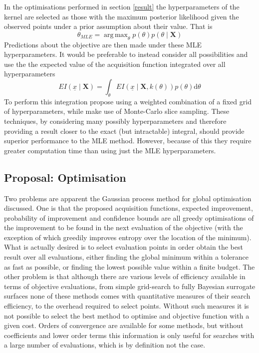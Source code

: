 \documentclass[a4paper, 10 pt, conference]{ieeeconf}  %
\DeclareMathOperator*{\argmax}{arg\,max}
\begin{document}
In the optimisations performed in section \ref{result} the hyperparameters of the kernel are selected as those with the maximum posterior likelihood given the observed points under a prior assumption about their value. That is
\begin{equation}
\theta_{MLE} = \argmax_{\theta} p(\theta)p(\theta \mid \mathbf{X})
\end{equation}
Predictions about the objective are then made under these MLE hyperparameters. It would be preferable to instead consider all possibilities and use the the expected value of the acquisition function integrated over all hyperparameters
\begin{equation}
EI(\underline{x} \mid \mathbf{X})  = \int_\theta EI(\underline{x} \mid \mathbf{X}, k(\theta)) p(\theta) \mathrm{d}\theta
\end{equation}
To perform this integration \cite{garnettgaussian} propose using a weighted combination of a fixed grid of hyperparameters, while \cite{murray2010slice} make use of Monte-Carlo slice sampling. These techniques, by considering many possibly hyperparameters and therefore providing a result closer to the exact (but intractable) integral, should provide superior performance to the MLE method. However, because of this they require greater computation time than using just the MLE hyperparameters.

\subsection{Proposal: Optimisation}
Two problems are apparent the Gaussian process method for global optimisation discussed. One is that the proposed acquisition functions, expected improvement, probability of improvement and confidence bounds are all greedy optimisations of the improvement to be found in the next evaluation of the objective (with the exception of \cite{hennig2012entropy} which greedily improves entropy over the location of the minimum). What is actually desired is to select evaluation points in order obtain the best result over all evaluations, either finding the global minimum within a tolerance as fast as possible, or finding the lowest possible value within a finite budget. The other problem is that although there are various levels of efficiency available in terms of objective evaluations, from simple grid-search to fully Bayesian surrogate surfaces none of these methods comes with quantitative measures of their search efficiency, to the overhead required to select points. Without such measures it is not possible to select the best method to optimise and objective function with a given cost. Orders of convergence are available for some methods, but without coefficients and lower order terms this information is only useful for searches with a large number of evaluations, which is by definition not the case.
\end{document}
